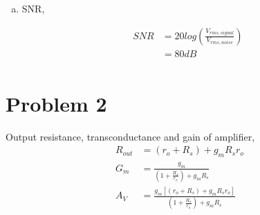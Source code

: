 \documentclass{article}
\begin{document}
\begin{enumerate}[(a)]
\item SNR,

\begin{equation*}
\begin{aligned}
SNR &= 20log(\frac{V_{rms,signal}}{V_{rms,noise}}) \\
&= 80 dB \\
\end{aligned}
\end{equation*}
\end{enumerate}

\section{Problem 2}
\label{sec:org6110393}
Output resistance, transconductance and gain of amplifier,
\begin{equation*}
\begin{aligned}
R_{out} &= (r_{o} + R_{s}) + g_{m}R_{s}r_{o} \\
G_{m} &= \frac{g_{m}}{(1 + \frac{R_{s}}{r_{o}}) + g_{m}R_{s}} \\
A_{V} &= \frac{g_{m}[(r_{o} + R_{s}) + g_{m}R_{s}r_{o}]}{(1 + \frac{R_{s}}{r_{o}}) + g_{m}R_{s}}\\
\end{aligned}
\end{equation*}
\end{document}
